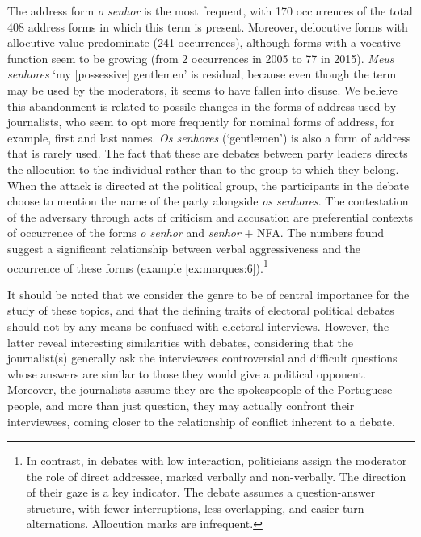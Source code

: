 \documentclass[output=paper]{langscibook}
\begin{document}
The address form \textit{o senhor} is the most frequent, with 170 occurrences of the total 408 address forms in which this term is present. Moreover, delocutive forms with allocutive value predominate (241 occurrences), although forms with a vocative function seem to be growing (from 2 occurrences in 2005 to 77 in 2015). \textit{Meus senhores} ‘my [possessive] gentlemen’ is residual, because even though the term may be used by the moderators, it seems to have fallen into disuse. We believe this abandonment is related to possile changes in the forms of address used by journalists, who seem to opt more frequently for nominal forms of address, for example, first and last names. \textit{Os senhores} (‘gentlemen’) is also a form of address that is rarely used. The fact that these are debates between party leaders directs the allocution to the individual rather than to the group to which they belong. When the attack is directed at the political group, the participants in the debate choose to mention the name of the party alongside \textit{os senhores}. The contestation of the adversary through acts of criticism and accusation are preferential contexts of occurrence of the forms \textit{o senhor} and \textit{senhor} + NFA. The numbers found suggest a significant relationship between verbal aggressiveness and the occurrence of these forms (example \ref{ex:marques:6}).{\footnote{In contrast, in debates with low interaction, politicians assign the moderator the role of direct addressee, marked verbally and non-verbally. The direction of their gaze is a key indicator. The debate assumes a question-answer structure, with fewer interruptions, less overlapping, and easier turn alternations. Allocution marks are infrequent.}}



It should be noted that we consider the genre to be of central importance for the study of these topics, and that the defining traits of electoral political debates should not by any means be confused with electoral interviews. However, the latter reveal interesting similarities with debates, considering that the journalist(s) generally ask the interviewees controversial and difficult questions whose answers are similar to those they would give a political opponent. Moreover, the journalists assume they are the spokespeople of the Portuguese people, and more than just question, they may actually confront their interviewees, coming closer to the relationship of conflict inherent to a debate. 
\end{document}
